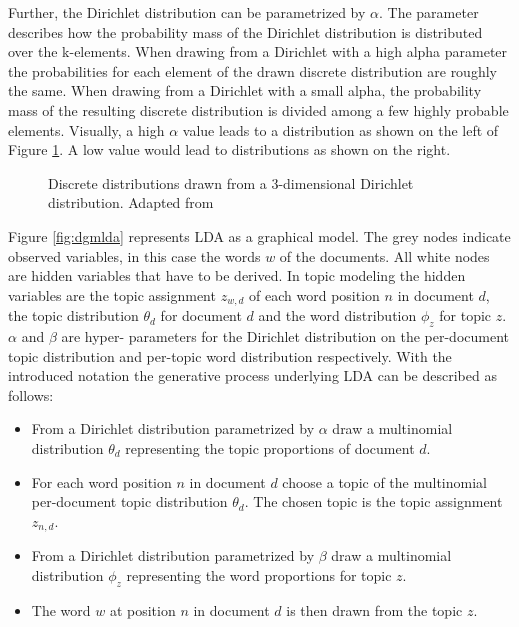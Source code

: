 Further, the Dirichlet distribution can be parametrized by $\alpha$. The parameter describes how the probability mass of the Dirichlet distribution is distributed over the k-elements. When drawing from a Dirichlet with a high alpha parameter the probabilities for each element of the drawn discrete distribution are roughly the same. When drawing from a Dirichlet with a small alpha, the probability mass of the resulting discrete distribution is divided among a few highly probable elements. Visually, a high $\alpha$ value leads to a distribution as shown on the left of Figure \ref{fig:dirichlet1}. A low value would lead to distributions as shown on the right.

\begin{figure}
	\centering
	
	\caption[Discrete distributions drawn from a 3-dimensional Dirichlet distribution]{Discrete distributions drawn from a 3-dimensional Dirichlet distribution. Adapted from \cite{Widmer2018}}
	\label{fig:dirichlet1}	
\end{figure}

Figure \ref{fig:dgmlda} represents LDA as a graphical model. The grey nodes indicate observed variables, in this case the words $w$ of the documents. All white nodes are hidden variables that have to be derived. In topic modeling the hidden variables are the topic assignment $z_{w,d}$ of each word position $n$ in document $d$, the topic distribution $\theta_d$ for document $d$ and the word distribution $\phi_z$ for topic $z$. $\alpha$ and $\beta$ are hyper- parameters for the Dirichlet distribution on the per-document topic distribution and per-topic word distribution respectively.
With the introduced notation the generative process underlying LDA can be described as follows:

\begin{itemize}
	\item From a Dirichlet distribution parametrized by $\alpha$ draw a multinomial distribution $\theta_d$ representing the topic proportions of document $d$. 
	\item For each word position $n$ in document $d$ choose a topic of the multinomial per-document topic distribution $\theta_d$. The chosen topic is the topic assignment $z_{n,d}$.
	\item From a Dirichlet distribution parametrized by $\beta$ draw a multinomial distribution $\phi_z$ representing the word proportions for topic $z$.
	\item The word $w$ at position $n$ in document $d$ is then drawn from the topic $z$. 
\end{itemize}

